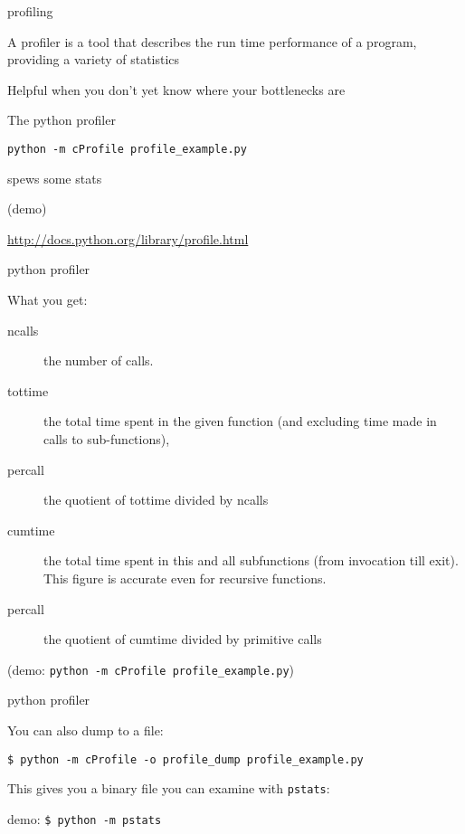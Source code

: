 \documentclass{beamer}
\begin{document}
\begin{frame}[fragile]{profiling}

{\Large A profiler is a tool that describes the run time performance of a
program, providing a variety of statistics}

\vfill
{\Large Helpful when you don't yet know where your bottlenecks are}

\vfill
{\Large The python profiler}

\begin{verbatim}
python -m cProfile profile_example.py  
\end{verbatim}
{\Large spews some stats}

(demo)

\vfill
\url{http://docs.python.org/library/profile.html}
\end{frame} 

\begin{frame}[fragile]{python profiler}

{\Large What you get:}

\begin{description}
  \item[ncalls] the number of calls.
  \item[tottime] the total time spent in the given function (and excluding time made in calls to sub-functions),
  \item[percall] the quotient of tottime divided by ncalls
  \item[cumtime] the total time spent in this and all subfunctions (from invocation till exit). This figure is accurate even for recursive functions.
  \item[percall] the quotient of cumtime divided by primitive calls
\end{description}
(demo: \verb|python -m cProfile profile_example.py|)
\end{frame} 

\begin{frame}[fragile]{python profiler}

{\Large You can also dump to a file:}

\vfill
{\verb|$ python -m cProfile -o profile_dump profile_example.py|}

\vfill
{\large This gives you a binary file you can examine with \verb|pstats|:}

\vfill
{demo: \verb|$ python -m pstats|}

\end{frame} 
\end{document}
